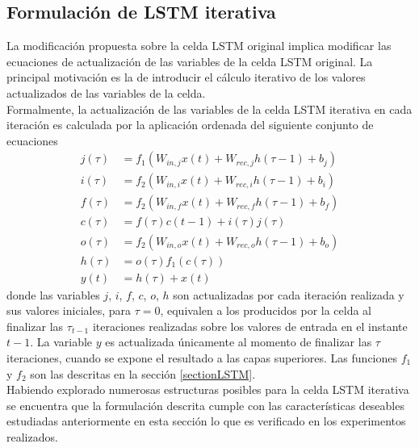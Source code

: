 \documentclass{article}
\begin{document}
	\subsection{Formulación de LSTM iterativa}
	La modificación propuesta sobre la celda LSTM original implica modificar las ecuaciones de actualización de las variables de la celda LSTM original. La principal motivación es la de introducir el cálculo iterativo de los valores actualizados de las variables de la celda.\\
	Formalmente, la actualización de las variables de la celda LSTM iterativa en cada iteración es calculada por la aplicación ordenada del siguiente conjunto de ecuaciones 
	\begin{equation}\label{iterativeLSTMformulation}
	\begin{split}
	j(\tau) &= f_1(W_{in, j} x(t) + W_{rec, j} h(\tau-1) + b_j)\\
	i(\tau) &= f_2(W_{in, i} x(t) + W_{rec, i} h(\tau-1) + b_i)\\
	f(\tau) &= f_2(W_{in, f} x(t) + W_{rec, f} h(\tau-1) + b_f)\\
	c(\tau) &= f(\tau)c(t-1) + i(\tau)j(\tau)\\
	o(\tau) &= f_2(W_{in, o} x(t) + W_{rec, o} h(\tau-1) + b_o)\\
	h(\tau) &= o(\tau)f_1(c(\tau))\\
	y(t) &= h(\tau) + x(t)
	\end{split}
	\end{equation}
	donde las variables $j$, $i$, $f$, $c$, $o$, $h$ son actualizadas por cada iteración realizada y sus valores iniciales, para $\tau=0$, equivalen a los producidos por la celda al finalizar las $\tau_{t-1}$ iteraciones realizadas sobre los valores de entrada en el instante $t-1$. La variable $y$ es actualizada únicamente al momento de finalizar las $\tau$ iteraciones, cuando se expone el resultado a las capas superiores. Las funciones $f_1$ y $f_2$ son las descritas en la sección \ref{sectionLSTM}.\\
	Habiendo explorado numerosas estructuras posibles para la celda LSTM iterativa se encuentra que la formulación descrita cumple con las características deseables estudiadas anteriormente en esta sección lo que es verificado en los experimentos realizados.\\
	
\end{document}
